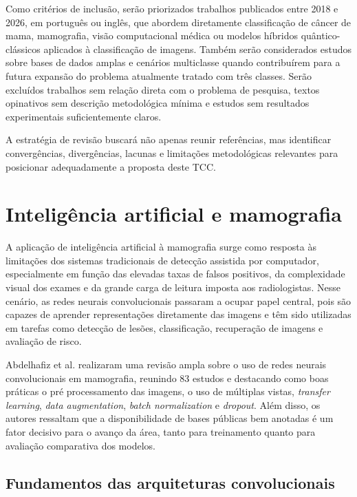 \documentclass[
    12pt,
    openright,
    oneside,
    a4paper,
    english,
    brazil
]{abntex2}
\begin{document}
Como critérios de inclusão, serão priorizados trabalhos publicados entre 2018 e 2026, em português ou inglês, que abordem diretamente classificação de câncer de mama, mamografia, visão computacional médica ou modelos híbridos quântico-clássicos aplicados à classificação de imagens. Também serão considerados estudos sobre bases de dados amplas e cenários multiclasse quando contribuírem para a futura expansão do problema atualmente tratado com três classes. Serão excluídos trabalhos sem relação direta com o problema de pesquisa, textos opinativos sem descrição metodológica mínima e estudos sem resultados experimentais suficientemente claros.

A estratégia de revisão buscará não apenas reunir referências, mas identificar convergências, divergências, lacunas e limitações metodológicas relevantes para posicionar adequadamente a proposta deste TCC.


\section{Inteligência artificial e mamografia}

A aplicação de inteligência artificial à mamografia surge como resposta às limitações dos sistemas tradicionais de detecção assistida por computador, especialmente em função das elevadas taxas de falsos positivos, da complexidade visual dos exames e da grande carga de leitura imposta aos radiologistas. Nesse cenário, as redes neurais convolucionais passaram a ocupar papel central, pois são capazes de aprender representações diretamente das imagens e têm sido utilizadas em tarefas como detecção de lesões, classificação, recuperação de imagens e avaliação de risco.

Abdelhafiz et al. \cite{abdelhafiz2019} realizaram uma revisão ampla sobre o uso de redes neurais convolucionais em mamografia, reunindo 83 estudos e destacando como boas práticas o pré processamento das imagens, o uso de múltiplas vistas, \textit{transfer learning}, \textit{data augmentation}, \textit{batch normalization} e \textit{dropout}. Além disso, os autores ressaltam que a disponibilidade de bases públicas bem anotadas é um fator decisivo para o avanço da área, tanto para treinamento quanto para avaliação comparativa dos modelos.

\subsection{Fundamentos das arquiteturas convolucionais}
\end{document}
